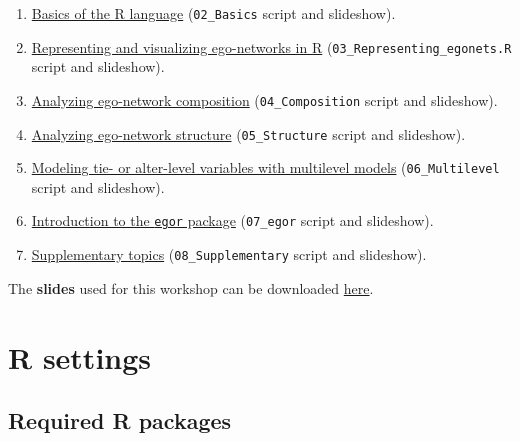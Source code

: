 \documentclass[
]{book}
\providecommand{\tightlist}{%
  \setlength{\itemsep}{0pt}\setlength{\parskip}{0pt}}
\begin{document}
\begin{enumerate}
\def\labelenumi{\arabic{enumi}.}
\setcounter{enumi}{1}
\tightlist
\item
  \protect\hyperlink{basics}{Basics of the R language} (\texttt{02\_Basics} script and slideshow).
\item
  \protect\hyperlink{represent}{Representing and visualizing ego-networks in R} (\texttt{03\_Representing\_egonets.R} script and slideshow).
\item
  \protect\hyperlink{composition}{Analyzing ego-network composition} (\texttt{04\_Composition} script and slideshow).
\item
  \protect\hyperlink{structure}{Analyzing ego-network structure} (\texttt{05\_Structure} script and slideshow).
\item
  \protect\hyperlink{multilevel}{Modeling tie- or alter-level variables with multilevel models} (\texttt{06\_Multilevel} script and slideshow).
\item
  \protect\hyperlink{egor}{Introduction to the \texttt{egor} package} (\texttt{07\_egor} script and slideshow).
\item
  \protect\hyperlink{supplementary}{Supplementary topics} (\texttt{08\_Supplementary} script and slideshow).
\end{enumerate}

The \textbf{slides} used for this workshop can be downloaded \href{https://www.dropbox.com/sh/o8rncfrtks1sx3s/AACyzgkwbhTDWsPIKST_2e6Ya?dl=0}{here}.

\hypertarget{r-settings}{%
\section{R settings}\label{r-settings}}

\hypertarget{packages}{%
\subsection{Required R packages}\label{packages}}
\end{document}
